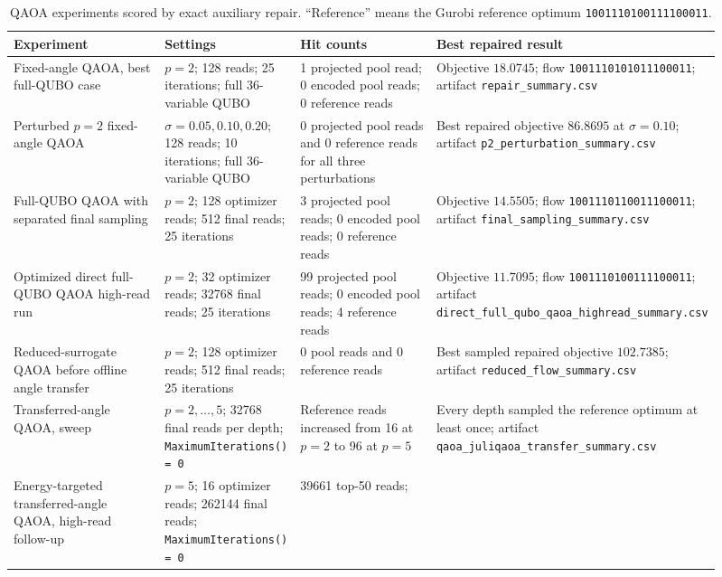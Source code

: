 \begin{table}[t]
\centering
\scriptsize
\caption{QAOA experiments scored by exact auxiliary repair. ``Reference'' means
the Gurobi reference optimum \texttt{1001110100111100011}.}
\label{tab:ds-mfg-qaoa-results}
\begin{tabular}{p{0.25\linewidth}p{0.19\linewidth}p{0.22\linewidth}p{0.25\linewidth}}
\hline
Experiment & Settings & Hit counts & Best repaired result \\
\hline
Fixed-angle QAOA, best full-QUBO case & $p=2$; 128 reads; 25 iterations; full
36-variable QUBO & 1 projected pool read; 0 encoded pool reads; 0 reference reads &
Objective $18.0745$; flow \texttt{1001110101011100011}; artifact
\texttt{repair\_summary.csv} \\
\hline
Perturbed $p=2$ fixed-angle QAOA & $\sigma=0.05,0.10,0.20$; 128 reads; 10
iterations; full 36-variable QUBO & 0 projected pool reads and 0 reference reads
for all three perturbations & Best repaired objective $86.8695$ at
$\sigma=0.10$; artifact \texttt{p2\_perturbation\_summary.csv} \\
\hline
Full-QUBO QAOA with separated final sampling & $p=2$; 128 optimizer reads; 512
final reads; 25 iterations & 3 projected pool reads; 0 encoded pool reads; 0
reference reads & Objective $14.5505$; flow
\texttt{1001110110011100011}; artifact
\texttt{final\_sampling\_summary.csv} \\
\hline
Optimized direct full-QUBO QAOA high-read run & $p=2$; 32 optimizer reads; 32768
final reads; 25 iterations & 99 projected pool reads; 0 encoded pool reads; 4
reference reads & Objective $11.7095$; flow
\texttt{1001110100111100011}; artifact
\texttt{direct\_full\_qubo\_qaoa\_highread\_summary.csv} \\
\hline
Reduced-surrogate QAOA before offline angle transfer & $p=2$; 128 optimizer
reads; 512 final reads; 25 iterations & 0 pool reads and 0 reference reads &
Best sampled repaired objective $102.7385$; artifact
\texttt{reduced\_flow\_summary.csv} \\
\hline
Transferred-angle QAOA, sweep & $p=2,\ldots,5$; 32768 final reads per depth;
\texttt{MaximumIterations() = 0} & Reference reads increased from 16 at $p=2$ to
96 at $p=5$ & Every depth sampled the reference optimum at least once; artifact
\texttt{qaoa\_juliqaoa\_transfer\_summary.csv} \\
\hline
Energy-targeted transferred-angle QAOA, high-read follow-up & $p=5$; 16 optimizer reads;
262144 final reads; \texttt{MaximumIterations() = 0} & 39661 top-50 reads;

\end{tabular}
\end{table}
